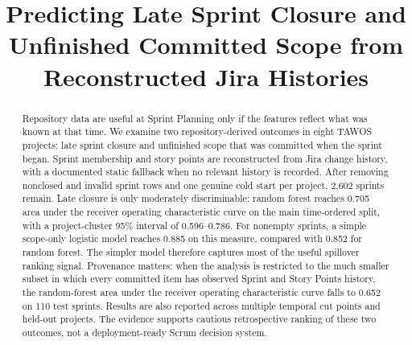 \documentclass[conference]{IEEEtran}
\begin{document}
\pagestyle{empty}

\title{Predicting Late Sprint Closure and Unfinished Committed Scope from Reconstructed Jira Histories}

\author{
\and
{}
\and
{}
}
\maketitle
\thispagestyle{empty}

\begin{abstract}
Repository data are useful at Sprint Planning only if the features reflect what was known at that time. We examine two repository-derived outcomes in eight TAWOS projects: late sprint closure and unfinished scope that was committed when the sprint began. Sprint membership and story points are reconstructed from Jira change history, with a documented static fallback when no relevant history is recorded. After removing nonclosed and invalid sprint rows and one genuine cold start per project, 2,602 sprints remain. Late closure is only moderately discriminable: random forest reaches 0.705 area under the receiver operating characteristic curve on the main time-ordered split, with a project-cluster 95\% interval of 0.596--0.786. For nonempty sprints, a simple scope-only logistic model reaches 0.885 on this measure, compared with 0.852 for random forest. The simpler model therefore captures most of the useful spillover ranking signal. Provenance matters: when the analysis is restricted to the much smaller subset in which every committed item has observed Sprint and Story Points history, the random-forest area under the receiver operating characteristic curve falls to 0.652 on 110 test sprints. Results are also reported across multiple temporal cut points and held-out projects. The evidence supports cautious retrospective ranking of these two outcomes, not a deployment-ready Scrum decision system.
\end{abstract}
\end{document}

